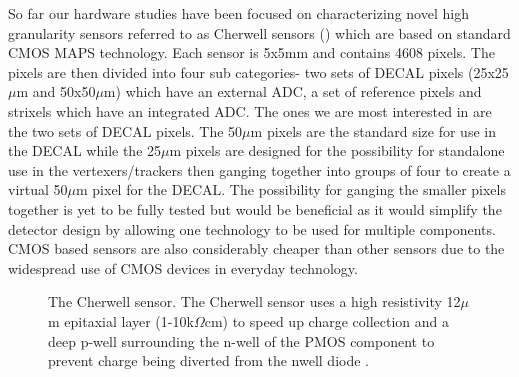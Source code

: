 So far our hardware studies have been focused on characterizing novel high granularity sensors referred to as Cherwell sensors () which are based on standard CMOS \ac{MAPS} technology. Each sensor is 5x5mm and contains 4608 pixels. The pixels are then divided into four sub categories- two sets of DECAL pixels (25x25${\mu}$m and 50x50${\mu}$m) which have an external \ac{ADC}, a set of reference pixels and strixels which have an integrated \ac{ADC}. The ones we are most interested in are the two sets of DECAL pixels. The 50${\mu}$m pixels are the standard size for use in the DECAL while the 25${\mu}$m pixels are designed for the possibility for standalone use in the vertexers/trackers then ganging together into groups of four to create a virtual 50${\mu}$m pixel for the DECAL. The possibility for ganging the smaller pixels together is yet to be fully tested but would be beneficial as it would simplify the detector design by allowing one technology to be used for multiple components. CMOS based sensors are also considerably cheaper than other sensors due to the widespread use of CMOS devices in everyday technology. 

\begin{figure}
  \centering
  \qquad
  \caption[The Cherwell Sensor]{The Cherwell sensor. The Cherwell sensor uses a high resistivity 12${\mu}$m epitaxial layer (1-10k${\Omega}$cm) to speed up charge collection and a deep p-well surrounding the n-well of the PMOS component to prevent charge being diverted from the nwell diode \cite{MylroieSmith}.}
  \label{Fig:cherwell}
\end{figure}

